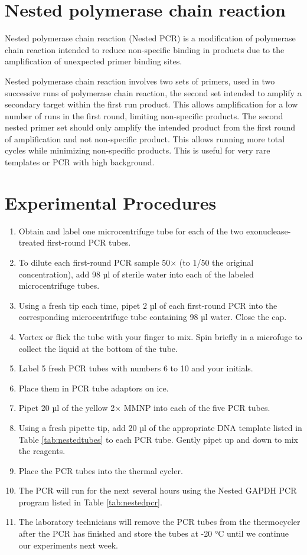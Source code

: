 \documentclass[]{book}
\providecommand{\tightlist}{%
  \setlength{\itemsep}{0pt}\setlength{\parskip}{0pt}}
\begin{document}
\section{Nested polymerase chain
reaction}\label{nested-polymerase-chain-reaction}

Nested polymerase chain reaction (Nested PCR) is a modification of
polymerase chain reaction intended to reduce non-specific binding in
products due to the amplification of unexpected primer binding sites.

Nested polymerase chain reaction involves two sets of primers, used in
two successive runs of polymerase chain reaction, the second set
intended to amplify a secondary target within the first run product.
This allows amplification for a low number of runs in the first round,
limiting non-specific products. The second nested primer set should only
amplify the intended product from the first round of amplification and
not non-specific product. This allows running more total cycles while
minimizing non-specific products. This is useful for very rare templates
or PCR with high background.

\section{Experimental Procedures}\label{experimental-procedures-11}

\begin{enumerate}
\def\labelenumi{\arabic{enumi}.}
\tightlist
\item
  Obtain and label one microcentrifuge tube for each of the two
  exonuclease-treated first-round PCR tubes.
\item
  To dilute each first-round PCR sample 50× (to 1/50 the original
  concentration), add 98 µl of sterile water into each of the labeled
  microcentrifuge tubes.
\item
  Using a fresh tip each time, pipet 2 µl of each first-round PCR into
  the corresponding microcentrifuge tube containing 98 µl water. Close
  the cap.
\item
  Vortex or flick the tube with your finger to mix. Spin briefly in a
  microfuge to collect the liquid at the bottom of the tube.
\item
  Label 5 fresh PCR tubes with numbers 6 to 10 and your initials.
\item
  Place them in PCR tube adaptors on ice.
\item
  Pipet 20 µl of the yellow 2× MMNP into each of the five PCR tubes.
\item
  Using a fresh pipette tip, add 20 µl of the appropriate DNA template
  listed in Table \ref{tab:nestedtubes} to each PCR tube. Gently pipet
  up and down to mix the reagents.
\item
  Place the PCR tubes into the thermal cycler.
\item
  The PCR will run for the next several hours using the Nested GAPDH PCR
  program listed in Table \ref{tab:nestedpcr}.
\item
  The laboratory technicians will remove the PCR tubes from the
  thermocycler after the PCR has finished and store the tubes at -20 °C
  until we continue our experiments next week.
\end{enumerate}
\end{document}
